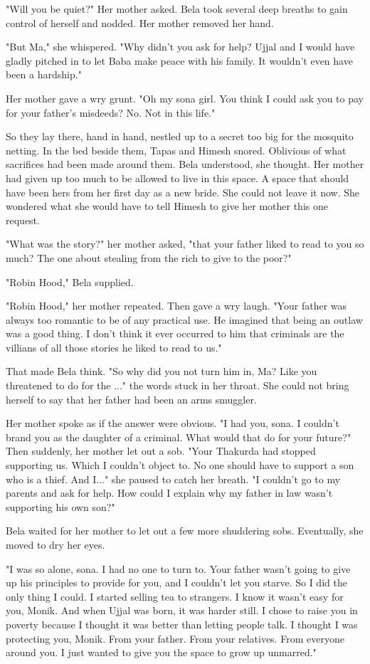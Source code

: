 \documentclass{amsart}
\begin{document}
"Will you be quiet?" Her mother asked. Bela took several deep breaths to gain control of herself and nodded. Her mother removed her hand. 

"But Ma," she whispered. "Why didn't you ask for help? Ujjal and I would have gladly pitched in to let Baba make peace with his family. It wouldn't even have been a hardship." 

Her mother gave a wry grunt. "Oh my sona girl. You think I could ask you to pay for your father's misdeeds? No. Not in this life."

So they lay there, hand in hand, nestled up to a secret too big for the mosquito netting. In the bed beside them, Tapas and Himesh snored. Oblivious of what sacrifices had been made around them. Bela understood, she thought. Her mother had given up too much to be allowed to live in this space. A space that should have been hers from her first day as a new bride. She could not leave it now. She wondered what she would have to tell Himesh to give her mother this one request. 

"What was the story?" her mother asked, "that your father liked to read to you so much? The one about stealing from the rich to give to the poor?" 

"Robin Hood," Bela supplied. 

"Robin Hood," her mother repeated. Then gave a wry laugh. "Your father was always too romantic to be of any practical use. He imagined that being an outlaw was a good thing. I don't think it ever occurred to him that criminals are the villians of all those stories he liked to read to us." 

That made Bela think. "So why did you not turn him in, Ma? Like you threatened to do for the ..." the words stuck in her throat. She could not bring herself to say that her father had been an arms smuggler. 

Her mother spoke as if the answer were obvious. "I had you, sona. I couldn't brand you as the daughter of a criminal. What would that do for your future?" Then suddenly, her mother let out a sob. "Your Thakurda had stopped supporting us. Which I couldn't object to. No one should have to support a son who is a thief. And I..." she paused to catch her breath. "I couldn't go to my parents and ask for help. How could I explain why my father in law wasn't supporting his own son?"

Bela waited for her mother to let out a few more shuddering sobs. Eventually, she moved to dry her eyes. 

"I was so alone, sona. I had no one to turn to. Your father wasn't going to give up his principles to provide for you, and I couldn't let you starve. So I did the only thing I could. I started selling tea to strangers. I know it wasn't easy for you, Monik. And when Ujjal was born, it was harder still. I chose to raise you in poverty because I thought it was better than letting people talk. I thought I was protecting you, Monik. From your father. From your relatives. From everyone around you. I just wanted to give you the space to grow up unmarred."
\end{document}
